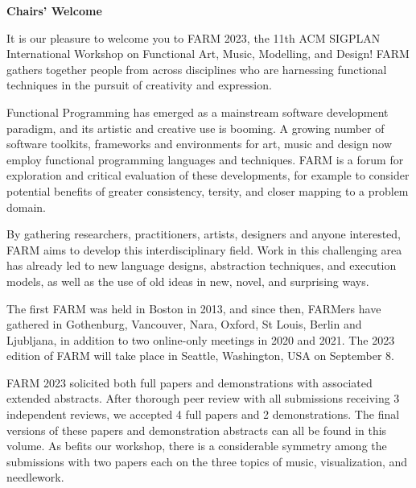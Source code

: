 \documentclass[sigplan]{acmart}
\begin{document}
\begin{center}
{\bfseries \Huge Chairs' Welcome}
\end{center}

\bigskip
\bigskip
\bigskip
\bigskip

\noindent
It is our pleasure to welcome you to FARM 2023, the 11th ACM SIGPLAN
International Workshop on Functional Art, Music, Modelling, and
Design! FARM gathers together people from across disciplines who are
harnessing functional techniques in the pursuit of creativity and
expression.

\bigskip

\noindent
Functional Programming has emerged as a mainstream software
development paradigm, and its artistic and creative use is booming. A
growing number of software toolkits, frameworks and environments for
art, music and design now employ functional programming languages and
techniques. FARM is a forum for exploration and critical evaluation of
these developments, for example to consider potential benefits of
greater consistency, tersity, and closer mapping to a problem domain.

\bigskip

\noindent
By gathering researchers, practitioners, artists, designers and anyone
interested, FARM aims to develop this interdisciplinary field. Work in
this challenging area has already led to new language designs,
abstraction techniques, and execution models, as well as the use of
old ideas in new, novel, and surprising ways.

\bigskip

\noindent
The first FARM was held in Boston in 2013, and since then, FARMers
have gathered in Gothenburg, Vancouver, Nara, Oxford, St Louis,
Berlin and Ljubljana, in addition to two online-only meetings in 2020
and 2021. The 2023 edition of FARM will take place in Seattle,
Washington, USA on September 8.

\bigskip

\noindent
FARM 2023 solicited both full papers and demonstrations with
associated extended abstracts. After thorough peer review with
all submissions receiving 3 independent reviews, we accepted 4 full
papers and 2 demonstrations. The final versions of these papers and
demonstration abstracts can all be found in this volume.
As befits our workshop, there is a considerable symmetry among the
submissions with two papers each on the three topics of music,
visualization, and needlework.

\bigskip
\end{document}
